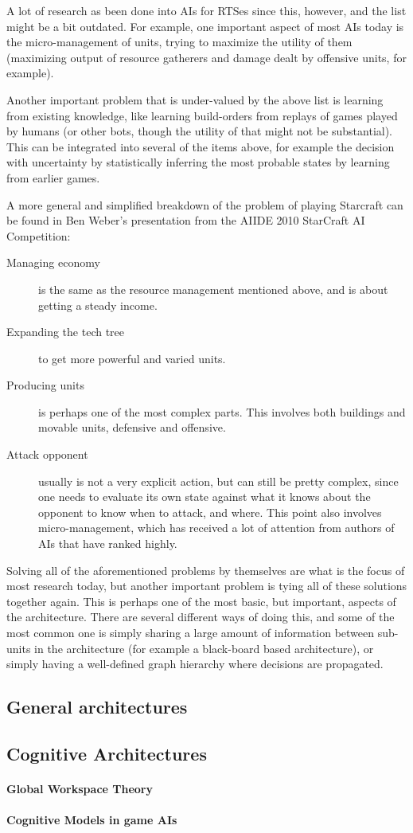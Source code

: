 A lot of research as been done into AIs for RTSes since this, however, and the
list might be a bit outdated. For example, one important aspect of most AIs
today is the micro-management of units, trying to maximize the utility of them 
(maximizing output of resource gatherers and damage dealt by offensive units,
for example).

Another important problem that is under-valued by the above list is learning
from existing knowledge, like learning build-orders from replays of games played
by humans (or other bots, though the utility of that might not be substantial).
This can be integrated into several of the items above, for example the decision
with uncertainty by statistically inferring the most probable states by
learning from earlier games.

A more general and simplified breakdown of the problem of playing Starcraft can
be found in Ben Weber's presentation from the AIIDE 2010 StarCraft AI
Competition:\cite{weber2010aiide}

\begin{description}
  \item [Managing economy] is the same as the resource management mentioned
    above, and is about getting a steady income.
  \item [Expanding the tech tree] to get more powerful and varied units.
  \item [Producing units] is perhaps one of the most complex parts. This
    involves both buildings and movable units, defensive and offensive.
  \item [Attack opponent] usually is not a very explicit action, but can still
    be pretty complex, since one needs to evaluate its own state against what
    it knows about the opponent to know when to attack, and where. This point
    also involves micro-management, which has received a lot of attention from 
    authors of AIs that have ranked highly.
\end{description}

Solving all of the aforementioned problems by themselves are what is the focus
of most research today, but another important problem is tying all of these
solutions together again. This is perhaps one of the most basic, but important,
aspects of the architecture. There are several different ways of doing this,
and some of the most common one is simply sharing a large amount of information
between sub-units in the architecture (for example a black-board based
architecture), or simply having a well-defined graph hierarchy where decisions
are propagated.

\subsection{General architectures}

\subsection{Cognitive Architectures}
\paragraph{Global Workspace Theory}
\paragraph{Cognitive Models in game AIs}
\cite{Arrabales2009}
